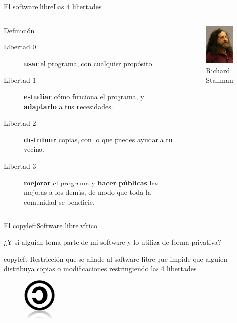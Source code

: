 \documentclass{beamer}
\begin{document}
\begin{frame}{El software libre}{Las 4 libertades}
  \begin{columns}
    \begin{block}{Definición}
      \begin{description}
      \item[Libertad 0] \textbf{usar} el programa, con cualquier                 propósito.
      \item[Libertad 1] \textbf{estudiar} cómo funciona el programa, y                 \textbf{adaptarlo}         a tus necesidades.
      \item[Libertad 2] \textbf{distribuir} copias, con lo que puedes                 ayudar a tu vecino.
      \item[Libertad 3] \textbf{mejorar} el programa y \textbf{hacer                     públicas} las         mejoras a los demás, de modo que toda la                 comunidad se beneficie.
      \end{description}
    \end{block}
    \begin{figure}
      \begin{center}
        \includegraphics[width=3cm]{pics/richard.pdf}
      \end{center}
      \caption{Richard Stallman}
    \end{figure}
  \end{columns}
\end{frame}

\begin{frame}{El copyleft}{Software libre vírico}

  \begin{block}{}
    \centering ¿Y si alguien toma parte de mi software y lo utiliza de         forma privativa?
  \end{block}
  \pause
  \begin{exampleblock}{copyleft}
    Restricción que se añade al software libre que impide que alguien         distribuya copias o     modificaciones restringiendo las 4 libertades
  \end{exampleblock}

  \begin{figure}
    \centering
    \includegraphics[width=0.15\textwidth]{pics/copyleft-wetfloo.png}
  \end{figure}
\end{frame}
\end{document}
